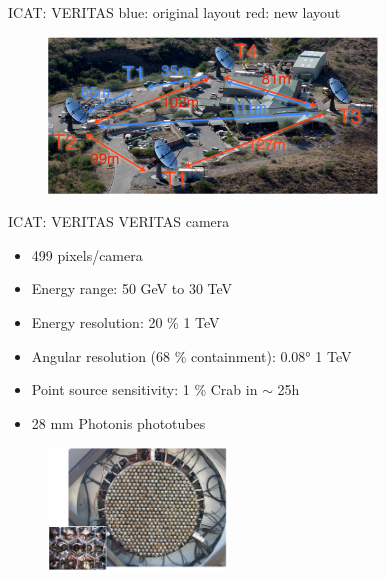 \documentclass{beamer}
\begin{document}
\begin{frame}{ICAT: VERITAS}
    blue: original layout
    \newline
    red: new layout
    \begin{figure}[h]
        \includegraphics[width=330px]{VERITAS_array.png}
    \end{figure}
\end{frame}


\begin{frame}{ICAT: VERITAS}
    VERITAS camera
    \begin{itemize}
        \item 499 pixels/camera
        \item Energy range: 50 GeV to 30 TeV
        \item Energy resolution: 20 \% \@ 1 TeV
        \item Angular resolution (68 \% containment): 0.08° \@ 1 TeV
        \item Point source sensitivity: 1 \% Crab in $\sim$ 25h
        \item 28 mm Photonis phototubes
    \end{itemize}
    \begin{figure}[h]
        \includegraphics[width=180px]{VERITAS_camera.png}
    \end{figure}
\end{frame}
\end{document}
